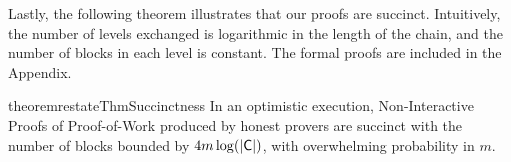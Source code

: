 Lastly, the following theorem illustrates that our proofs are succinct.
Intuitively, the number of levels exchanged is logarithmic in the length of the
chain, and the number of blocks in each level is constant. The formal proofs
are included in the Appendix.

\begin{restatable}{theorem}{restateThmSuccinctness}
    \label{thm.succinctness}
    In an optimistic execution, Non-Interactive Proofs of Proof-of-Work produced
    by honest provers are succinct with the number of blocks bounded by $4m
    \log(|\mathsf{C}|)$, with overwhelming probability in $m$.
\end{restatable}
